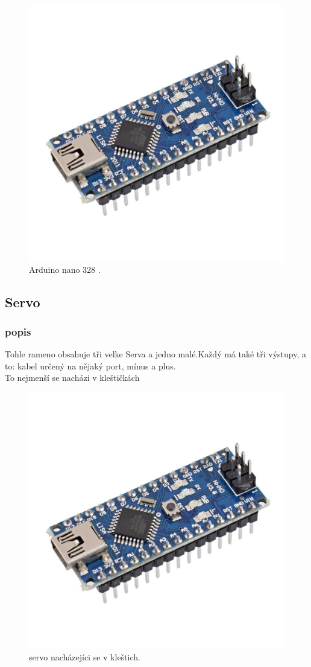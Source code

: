 \documentclass[12pt, a4paper,
twoside,        %
openright
]{report}
\begin{document}
{	\begin{figure}[h]
	
	\centering
	\includegraphics[width=0.6\linewidth]{image/arduino.jpg} 
	
	\caption{Arduino nano 328 \cite{Arduino}.} %
	\label{fig:Arduino} %
\end{figure}

\newpage 

\subsection{Servo }
\subsubsection{popis}
	Tohle rameno obsahuje tři velke Serva a jedno malé.Každý
	má také tři výstupy, a to: kabel určený na nějaký port, mínus a plus. 
	\\
	To nejmenší se nacházi v kleštičkách 
\begin{figure}[h]
	
	\centering
	\includegraphics[width=0.4\linewidth]{image/arduino.jpg} 
	
	\caption{servo nacházejíci se v kleštich\cite{servo-kleste}.} %
	\label{fig:servo-kleste} %
\end{figure}

}
\end{document}
